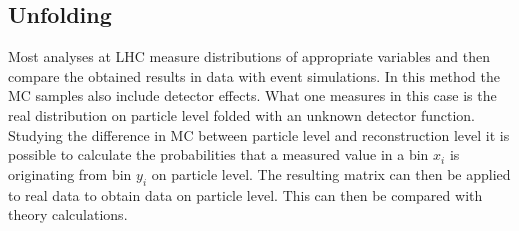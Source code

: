\subsection{Unfolding}
	Most analyses at LHC measure distributions of appropriate variables and then compare the obtained results in data with event simulations. In this method the MC samples also include detector effects. What one measures in this case is the real distribution on particle level folded with an unknown detector function. Studying the difference in MC between particle level and reconstruction level it is possible to calculate the probabilities that a measured value in a bin $x_i$ is originating from bin $y_i$ on particle level. The resulting matrix can then be applied to real data to obtain data on particle level. This can then be compared with theory calculations.
	